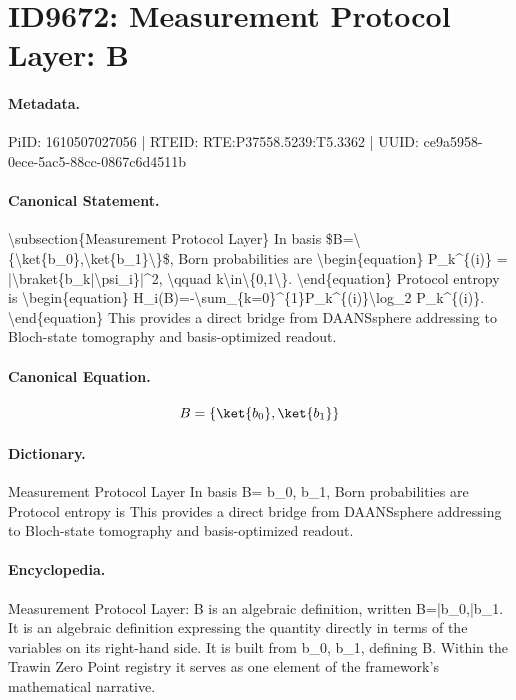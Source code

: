 \section*{ID9672: Measurement Protocol Layer: B}
\paragraph{Metadata.}
PiID: 1610507027056 | RTEID: RTE:P37558.5239:T5.3362 | UUID: ce9a5958-0ece-5ac5-88cc-0867c6d4511b

\paragraph{Canonical Statement.}
\textbackslash{}subsection\{Measurement Protocol Layer\} In basis \$B=\textbackslash{}\{\textbackslash{}ket\{b\_0\},\textbackslash{}ket\{b\_1\}\textbackslash{}\}\$, Born probabilities are \textbackslash{}begin\{equation\} P\_k\textasciicircum{}\{(i)\} = |\textbackslash{}braket\{b\_k|\textbackslash{}psi\_i\}|\textasciicircum{}2, \textbackslash{}qquad k\textbackslash{}in\textbackslash{}\{0,1\textbackslash{}\}. \textbackslash{}end\{equation\} Protocol entropy is \textbackslash{}begin\{equation\} H\_i(B)=-\textbackslash{}sum\_\{k=0\}\textasciicircum{}\{1\}P\_k\textasciicircum{}\{(i)\}\textbackslash{}log\_2 P\_k\textasciicircum{}\{(i)\}. \textbackslash{}end\{equation\} This provides a direct bridge from DAANSsphere addressing to Bloch-state tomography and basis-optimized readout.

\paragraph{Canonical Equation.}
\[
B=\{\ket{b_0},\ket{b_1}\}
\]

\paragraph{Dictionary.}
Measurement Protocol Layer In basis B= b\_0, b\_1, Born probabilities are Protocol entropy is This provides a direct bridge from DAANSsphere addressing to Bloch-state tomography and basis-optimized readout.

\paragraph{Encyclopedia.}
Measurement Protocol Layer: B is an algebraic definition, written B=|b\_0,|b\_1. It is an algebraic definition expressing the quantity directly in terms of the variables on its right-hand side. It is built from b\_0, b\_1, defining B. Within the Trawin Zero Point registry it serves as one element of the framework's mathematical narrative.

